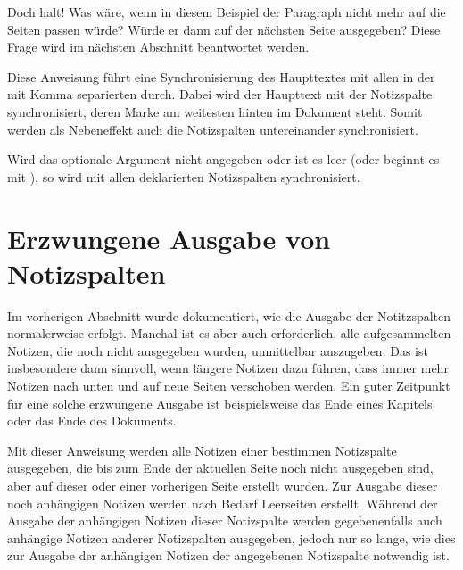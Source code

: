Doch halt! Was wäre, wenn in diesem Beispiel der Paragraph nicht mehr auf die
Seiten passen würde? Würde er dann auf der nächsten Seite ausgegeben? Diese
Frage wird im nächsten Abschnitt beantwortet werden.
\EndIndexGroup


\begin{Declaration}
\end{Declaration}
Diese Anweisung führt eine Synchronisierung des Haupttextes mit allen in der
mit Komma separierten  durch. Dabei wird der
Haupttext mit der Notizspalte synchronisiert, deren Marke am weitesten hinten
im Dokument steht. Somit werden als Nebeneffekt auch die Notizspalten
untereinander synchronisiert.

Wird das optionale Argument nicht angegeben oder ist es leer (oder beginnt es
mit ), so wird mit allen deklarierten Notizspalten
synchronisiert.%
\EndIndexGroup


\section{Erzwungene Ausgabe von Notizspalten}

\iftrue %
Im vorherigen Abschnitt wurde dokumentiert, wie die Ausgabe der Notitzspalten
normalerweise erfolgt. Manchal ist es aber %
\else%
Neben der normalen Ausgabe der Notizspalten, wie sie im vorherigen Abschnitt
beschrieben ist, ist es manchmal %
\fi %
auch erforderlich, alle aufgesammelten Notizen, die noch nicht ausgegeben
wurden, unmittelbar auszugeben. Das ist insbesondere dann sinnvoll, wenn
längere Notizen dazu führen, dass immer mehr Notizen nach unten und auf neue
Seiten verschoben werden. Ein guter Zeitpunkt für eine solche erzwungene
Ausgabe ist beispielsweise das Ende eines Kapitels
oder das Ende des Dokuments.

\begin{Declaration}
\end{Declaration}
Mit dieser Anweisung werden alle Notizen einer bestimmen Notizspalte
ausgegeben, die
bis zum Ende der aktuellen Seite noch nicht ausgegeben sind, aber auf dieser
oder einer vorherigen Seite erstellt wurden. Zur Ausgabe dieser noch
anhängigen Notizen werden nach Bedarf Leerseiten erstellt. Während der Ausgabe
der anhängigen Notizen dieser Notizspalte werden gegebenenfalls auch anhängige
Notizen anderer Notizspalten ausgegeben, jedoch nur so lange, wie dies zur
Ausgabe der anhängigen Notizen der angegebenen Notizspalte notwendig ist.

